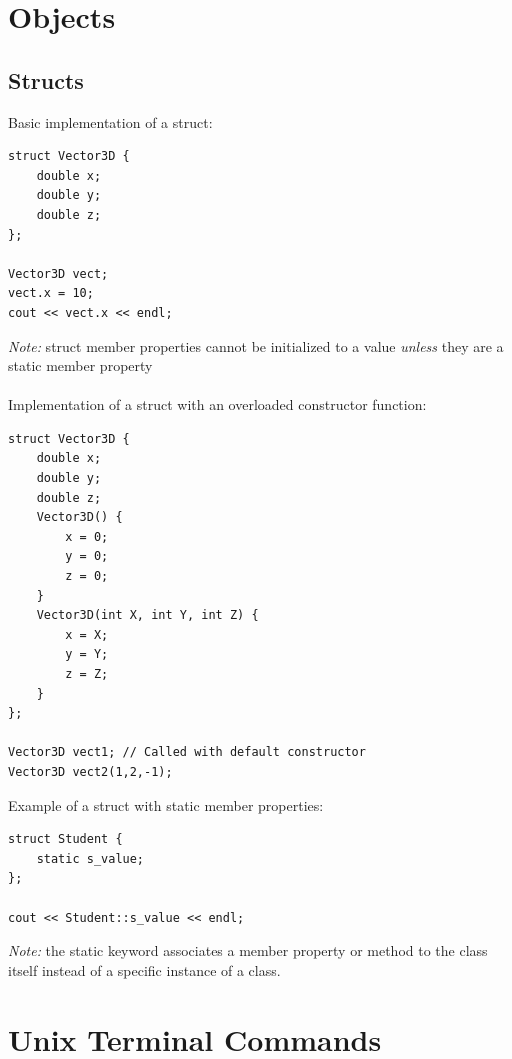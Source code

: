 \documentclass{article}
\begin{document}
\section{Objects}

\subsection{Structs}
Basic implementation of a struct:
\begin{lstlisting}
struct Vector3D {
	double x;
	double y;
	double z;
};

Vector3D vect;
vect.x = 10;
cout << vect.x << endl;
\end{lstlisting}
\emph{Note:} struct member properties cannot be initialized to a value \emph{unless} they are a static member property
\\
\\
Implementation of a struct with an overloaded constructor function:
\begin{lstlisting}
struct Vector3D {
	double x;
	double y;
	double z;
	Vector3D() {
		x = 0;
		y = 0;
		z = 0;
	}
	Vector3D(int X, int Y, int Z) {
		x = X;
		y = Y;
		z = Z;
	}
};

Vector3D vect1; // Called with default constructor
Vector3D vect2(1,2,-1);
\end{lstlisting}

Example of a struct with static member properties:
\begin{lstlisting}
struct Student {
	static s_value;
};

cout << Student::s_value << endl;
\end{lstlisting}
\emph{Note: } the static keyword associates a member property or method to the class itself instead of a specific instance of a class.

\section{Unix Terminal Commands}
\end{document}
